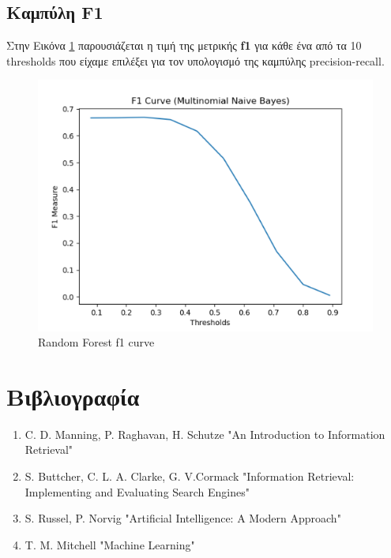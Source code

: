 \documentclass[12pt]{article}
\begin{document}
\subsection{Καμπύλη F1}
Στην Εικόνα \ref{fig:rf-f1} παρουσιάζεται η τιμή της μετρικής \textbf{f1} για κάθε ένα από τα 10 thresholds που είχαμε επιλέξει για τον υπολογισμό της καμπύλης precision-recall.
\begin{figure}[H]
    \centering
    \includegraphics[scale=.8]{images/rf-f1}
    \caption{Random Forest f1 curve}
    \label{fig:rf-f1}
 \end{figure}
 
 \section*{Βιβλιογραφία}
 \begin{enumerate}
     \item C. D. Manning, P. Raghavan, H. Schutze "An Introduction to Information Retrieval"
     \item S. Buttcher, C. L. A. Clarke, G. V.Cormack "Information Retrieval: Implementing and Evaluating Search Engines"
    \item S. Russel, P. Norvig "Artificial Intelligence: A Modern Approach"
    \item T. M. Mitchell "Machine Learning"
 \end{enumerate}
 
\end{document}
